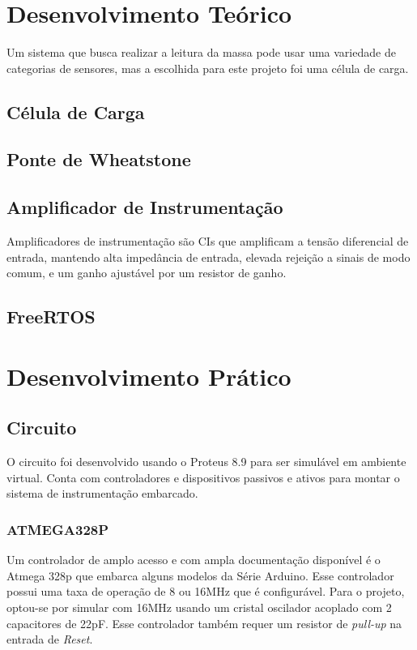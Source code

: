 \documentclass[a4paper, 12pt]{article}
\begin{document}
	\section{Desenvolvimento Teórico}
	Um sistema que busca realizar a leitura da massa pode usar uma variedade de categorias de sensores, mas a escolhida para este projeto foi uma célula de carga.
	
	\subsection{Célula de Carga}
	
	\subsection{Ponte de Wheatstone}
	
	\subsection{Amplificador de Instrumentação}
	Amplificadores de instrumentação são CIs que amplificam a tensão diferencial de entrada, mantendo alta impedância de entrada, elevada rejeição a sinais de modo comum, e um ganho ajustável por um resistor de ganho. 
	
	\subsection{FreeRTOS}
	
	
	\section{Desenvolvimento Prático}
	
	\subsection{Circuito}
	O circuito foi desenvolvido usando o Proteus 8.9 para ser simulável em ambiente virtual. Conta com controladores e dispositivos passivos e ativos para montar o sistema de instrumentação embarcado.  
	
	\subsubsection{ATMEGA328P}
	Um controlador de amplo acesso e com ampla documentação disponível é o Atmega 328p que embarca alguns modelos da Série Arduino. Esse controlador possui uma taxa de operação de 8 ou 16MHz que é configurável. Para o projeto, optou-se por simular com 16MHz usando um cristal oscilador acoplado com 2 capacitores de 22pF. Esse controlador também requer um resistor  de \textit{pull-up} na entrada de \textit{Reset}.
	
\end{document}
